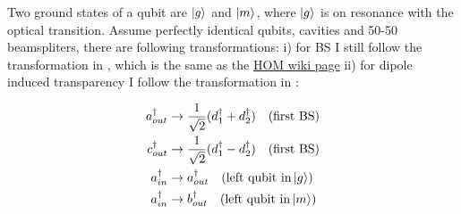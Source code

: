 \documentclass[letterpaper,10pt]{article}
\begin{document}
Two ground states of a qubit are $\Ket{g}$ and $\Ket{m}$, where $\Ket{g}$ is on resonance with the optical transition. Assume perfectly identical qubits, cavities and 50-50 beamspliters, there are following transformations: i) for BS I still follow the transformation in \cite{Sridharan2008}, which is the same as the \href{https://en.wikipedia.org/wiki/Hong%E2%80%93Ou%E2%80%93Mandel_effect}{HOM wiki page} ii) for dipole induced transparency I follow the transformation in \cite{Waks2006}:

\begin{align*}
	a_{out}^\dag&\rightarrow\frac{1}{\sqrt{2}}(d_1^\dag+d_2^\dag)\quad (\textrm{first BS})\\
	c_{out}^\dag&\rightarrow\frac{1}{\sqrt{2}}(d_1^\dag-d_2^\dag)\quad (\textrm{first BS})\\
	a_{in}^\dag&\rightarrow a_{out}^\dag\quad (\textrm{left qubit in} \Ket{g})\\
	a_{in}^\dag&\rightarrow b_{out}^\dag\quad (\textrm{left qubit in} \Ket{m})
\end{align*}

\end{document}
